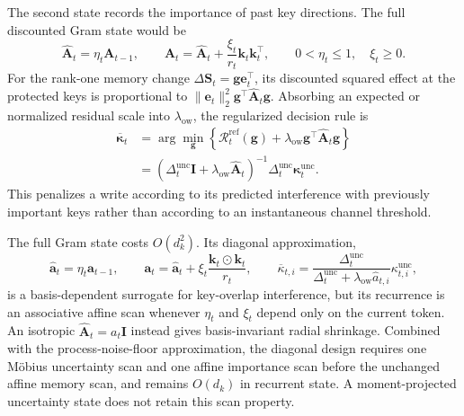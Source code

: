 \documentclass[11pt]{article}
\newcommand{\vct}[1]{\boldsymbol{#1}}
\begin{document}
The second state records the importance of past key directions. The full discounted Gram state
would be
\begin{equation}
  \widehat{\vct{A}}_t
  =\eta_t\vct{A}_{t-1},
  \qquad
  \vct{A}_t
  =\widehat{\vct{A}}_t
   +\frac{\xi_t}{r_t}\vct{k}_t\vct{k}_t^\top,
  \qquad
  0<\eta_t\leq1,\quad \xi_t\geq0.
  \label{eq:discussion-protection-full-gram}
\end{equation}
For the rank-one memory change
$\Delta\vct{S}_t=\vct{g}\vct{e}_t^\top$, its discounted squared effect at the protected keys is
proportional to
$\|\vct{e}_t\|_2^2\vct{g}^\top\widehat{\vct{A}}_t\vct{g}$. Absorbing an expected or normalized
residual scale into $\lambda_{\mathrm{ow}}$, the regularized decision rule is
\begin{equation}
\begin{aligned}
  \overline{\vct{\kappa}}_t
  &=\arg\min_{\vct{g}}\left\{
      \mathcal{R}_t^{\mathrm{ref}}(\vct{g})
      +\lambda_{\mathrm{ow}}
       \vct{g}^\top\widehat{\vct{A}}_t\vct{g}
    \right\} \\
  &=\left(
      \Delta_t^{\mathrm{unc}}\vct{I}
      +\lambda_{\mathrm{ow}}\widehat{\vct{A}}_t
    \right)^{-1}
    \Delta_t^{\mathrm{unc}}\vct{\kappa}_t^{\mathrm{unc}}.
\end{aligned}
  \label{eq:discussion-overwrite-regularized-gain}
\end{equation}
This penalizes a write according to its predicted interference with previously important keys
rather than according to an instantaneous channel threshold.

The full Gram state costs $O(d_k^2)$. Its diagonal approximation,
\begin{equation}
  \widehat{\vct{a}}_t
  =\eta_t\vct{a}_{t-1},
  \qquad
  \vct{a}_t
  =\widehat{\vct{a}}_t
   +\xi_t\frac{\vct{k}_t\odot\vct{k}_t}{r_t},
  \qquad
  \overline\kappa_{t,i}
  =\frac{\Delta_t^{\mathrm{unc}}}
    {\Delta_t^{\mathrm{unc}}+\lambda_{\mathrm{ow}}\widehat a_{t,i}}
    \kappa_{t,i}^{\mathrm{unc}},
  \label{eq:discussion-protection-importance-scan}
\end{equation}
is a basis-dependent surrogate for key-overlap interference, but its recurrence is an associative
affine scan whenever $\eta_t$ and $\xi_t$ depend only on the current token. An isotropic
$\widehat{\vct{A}}_t=a_t\vct{I}$ instead gives basis-invariant radial shrinkage. Combined with the
process-noise-floor approximation, the diagonal design requires one M\"obius uncertainty scan and
one affine importance scan before the unchanged affine memory scan, and remains $O(d_k)$ in
recurrent state. A moment-projected uncertainty state does not retain this scan property.
\end{document}
